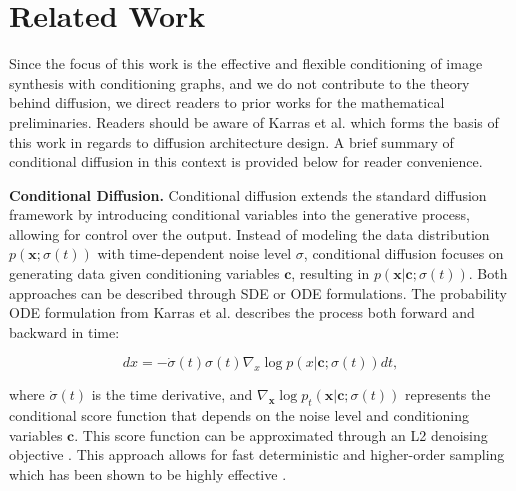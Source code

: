 \section{Related Work}
\label{sec:related_work}

Since the focus of this work is the effective and flexible conditioning of image synthesis with conditioning graphs, and we do not contribute to the theory behind diffusion, we direct readers to prior works \cite{sohl-dickstein_deep_2015, song_score-based_2021, ho_denoising_2020, karras_elucidating_2022} for the mathematical preliminaries. Readers should be aware of Karras et al. \cite{karras_analyzing_2024} which forms the basis of this work in regards to diffusion architecture design. A brief summary of conditional diffusion in this context is provided below for reader convenience.

\textbf{Conditional Diffusion.} Conditional diffusion extends the standard diffusion framework by introducing conditional variables into the generative process, allowing for control over the output. Instead of modeling the data distribution \( p(\mathbf{x}; \sigma(t)) \) with time-dependent noise level $\sigma$, conditional diffusion focuses on generating data given conditioning variables \( \mathbf{c} \), resulting in \( p(\mathbf{x} | \mathbf{c}; \sigma(t)) \). Both approaches can be described through SDE or ODE formulations. The probability ODE formulation from Karras et al. \cite{karras_elucidating_2022} describes the process both forward and backward in time:

\begin{equation}
    dx = -\dot{\sigma}(t)\sigma(t) \nabla_x \log p(x| \mathbf{c}; \sigma(t)) dt,
    \label{eq:karras_1}
\end{equation}

where \(\dot{\sigma}(t)\) is the time derivative, and \( \nabla_{\mathbf{x}} \log p_t(\mathbf{x} | \mathbf{c}; \sigma(t)) \) represents the conditional score function that depends on the noise level and conditioning variables $\mathbf{c}$. This score function can be approximated through an L2 denoising objective \cite{karras_elucidating_2022, song_score-based_2021}. This approach allows for fast deterministic and higher-order sampling which has been shown to be highly effective \cite{karras_elucidating_2022}.

